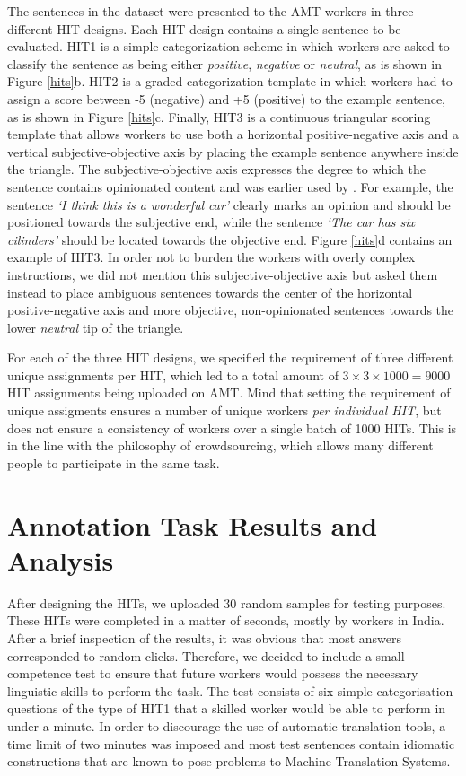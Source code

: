 \documentclass[11pt,letterpaper]{article}
\begin{document}
The sentences in the dataset were presented to the AMT workers in three different HIT designs. Each HIT design contains a single sentence to be evaluated. HIT1 is a simple categorization scheme in which workers are asked to classify the sentence as being either \textit{positive}, \textit{negative} or \textit{neutral}, as is shown in Figure \ref{hits}b. HIT2 is a graded categorization template in which workers had to assign a score between -5 (negative) and +5 (positive) to the example sentence, as is shown in Figure \ref{hits}c. Finally, HIT3 is a continuous triangular scoring template that allows workers to use both a horizontal positive-negative axis and a vertical subjective-objective axis by placing the example sentence anywhere inside the triangle. The subjective-objective axis expresses the degree to which the sentence contains opinionated content and was earlier used by \cite{sentiwordnet:06}. For example, the sentence \textit{`I think this is a wonderful car'} clearly marks an opinion and should be positioned towards the subjective end, while the sentence \textit{`The car has six cilinders'} should be located towards the objective end. Figure \ref{hits}d contains an example of HIT3. In order not to burden the workers with overly complex instructions, we did not mention this subjective-objective axis but asked them instead to place ambiguous sentences towards the center of the horizontal positive-negative axis and more objective, non-opinionated sentences towards the lower \textit{neutral} tip of the triangle.

For each of the three HIT designs, we specified the requirement of three different unique assignments per HIT, which led to a total amount of $3 \times 3 \times 1000 = 9000$ HIT assignments being uploaded on AMT. Mind that setting the requirement of unique assigments ensures a number of unique workers \textit{per individual HIT}, but does not ensure a consistency of workers over a single batch of 1000 HITs. This is in the line with the philosophy of crowdsourcing, which allows many different people to participate in the same task.

\section{Annotation Task Results and Analysis}
\label{sect:results}

After designing the HITs, we uploaded 30 random samples for testing purposes. These HITs were completed in a matter of seconds, mostly by workers in India. After a brief inspection of the results, it was obvious that most answers corresponded to random clicks. Therefore, we decided to include a small competence test to ensure that future workers would possess the necessary linguistic skills to perform the task. The test consists of six simple categorisation questions of the type of HIT1 that a skilled worker would be able to perform in under a minute. In order to discourage the use of automatic translation tools, a time limit of two minutes was  imposed and most test sentences contain idiomatic constructions that are known to pose problems to Machine Translation Systems.
\end{document}
